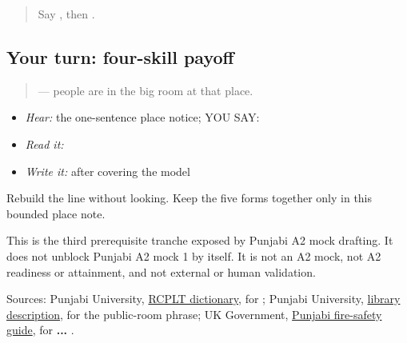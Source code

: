 \begin{quote}
Say \textbf{}, then \textbf{     }.
\end{quote}

\subsection*{Your turn: four-skill payoff}
\begin{quote}
\textbf{       } — people are in the big room at that place.
\end{quote}

\begin{itemize}
\raggedright
  \item \emph{Hear:} the one-sentence place notice; YOU SAY: \textbf{       }
  \item \emph{Read it:} \textbf{       }
  \item \emph{Write it:} \textbf{       } after covering the model
\end{itemize}

\begin{tcolorbox}[breakable,colback=teal!4,colframe=teal!35!black,title={Before you move on}]
Rebuild the line without looking. Keep the five forms together only in this bounded place note.

This is the third prerequisite tranche exposed by Punjabi A2 mock drafting. It does not unblock Punjabi A2 mock 1 by itself. It is not an A2 mock, not A2 readiness or attainment, and not external or human validation.

Sources: Punjabi University, \href{https://dic.learnpunjabi.org/default.aspx?look=\%E0\%A8\%B2\%E0\%A9\%8B\%E0\%A8\%95}{RCPLT dictionary}, for \textbf{}; Punjabi University, \href{https://punjabiuniversity.ac.in/Pages/Department.aspx?dsenc=129}{library description}, for the public-room phrase; UK Government, \href{https://www.hantsfire.gov.uk/wp-content/uploads/2021/03/Punjabi-Fire-Safety-in-the-Home.pdf}{Punjabi fire-safety guide}, for \textbf{ ... }.
\end{tcolorbox}
